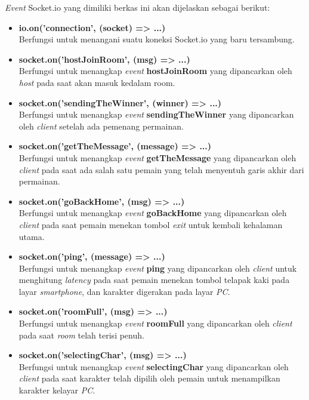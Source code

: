 \begin{enumerate}
\begin{enumerate}
		\textit{Event} Socket.io yang dimiliki berkas ini akan dijelaskan sebagai berikut:
		\begin{itemize}
			\item \textbf{io.on('connection', (socket) => {...})} \\
			Berfungsi untuk menangani suatu koneksi Socket.io yang baru tersambung.
			
			\item \textbf{socket.on('hostJoinRoom', (msg) => {...})} \\ 
			Berfungsi untuk menangkap \textit{event} \textbf{hostJoinRoom} yang dipancarkan oleh \textit{host} pada saat akan masuk kedalam room.
			
			\item \textbf{socket.on('sendingTheWinner', (winner) => {...})} \\
			Berfungsi untuk menangkap \textit{event} \textbf{sendingTheWinner} yang dipancarkan oleh \textit{client} setelah ada pemenang permainan.
			
			\item \textbf{socket.on('getTheMessage', (message) => {...})} \\
			Berfungsi untuk menangkap \textit{event} \textbf{getTheMessage} yang dipancarkan oleh \textit{client} pada saat ada salah satu pemain yang telah menyentuh garis akhir dari permainan.
			
			\item \textbf{socket.on('goBackHome', (msg) => {...})} \\
			Berfungsi untuk menangkap \textit{event} \textbf{goBackHome} yang dipancarkan oleh \textit{client} pada saat pemain menekan tombol \textit{exit} untuk kembali kehalaman utama.
			
			\item \textbf{socket.on('ping', (message) => {...})} \\
			Berfungsi untuk menangkap \textit{event} \textbf{ping} yang dipancarkan oleh \textit{client} untuk menghitung \textit{latency} pada saat pemain menekan tombol telapak kaki pada layar \textit{smartphone}, dan karakter digerakan pada layar \textit{PC}.
			
			\item \textbf{socket.on('roomFull', (msg) => {...})} \\
			Berfungsi untuk menangkap \textit{event} \textbf{roomFull} yang dipancarkan oleh \textit{client} pada saat \textit{room} telah terisi penuh.
			
			\item \textbf{socket.on('selectingChar', (msg) => {...})} \\
			Berfungsi untuk menangkap \textit{event} \textbf{selectingChar} yang dipancarkan oleh \textit{client} pada saat karakter telah dipilih oleh pemain untuk menampilkan karakter kelayar \textit{PC}.
			

\end{itemize}
\end{enumerate}
\end{enumerate}
